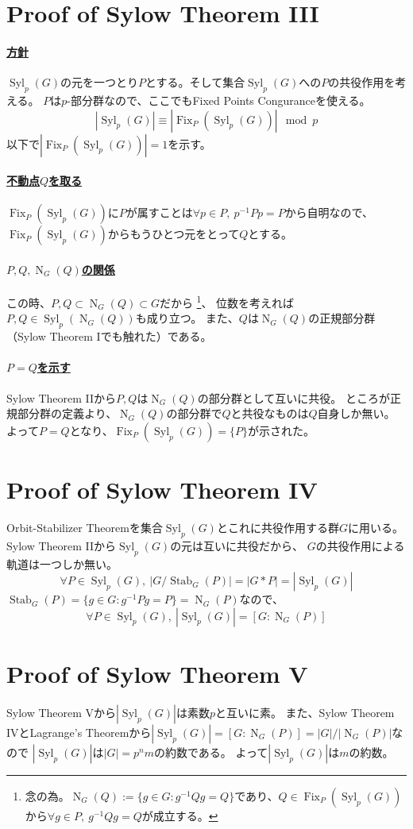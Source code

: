 \documentclass[a4paper]{jarticle}
\newcommand{\Stab}{\operatorname{Stab}}
\newcommand{\Fix}{\operatorname{Fix}}
\newcommand{\Norm}{\operatorname{N}}
\newcommand{\Syl}{\operatorname{Syl}}
\newcommand{\ulpar}[1]{\paragraph{\underline{#1}}}
\begin{document}
    \section{Proof of Sylow Theorem III}
    \ulpar{方針}
    $\Syl_p(G)$の元を一つとり$P$とする。そして集合$\Syl_p(G)$への$P$の共役作用を考える。
    $P$は$p$-部分群なので、ここでもFixed Points Conguranceを使える。
    \[ |\Syl_p(G)| \equiv |\Fix_P(\Syl_p(G))| \mod p\]
    以下で$|\Fix_P(\Syl_p(G))|=1$を示す。

    \ulpar{不動点$Q$を取る}
    $\Fix_P(\Syl_p(G))$に$P$が属すことは$\forall p \in P,~ p^{-1}Pp=P$から自明なので、
    $\Fix_P(\Syl_p(G))$からもうひとつ元をとって$Q$とする。

    \ulpar{$P, Q, \Norm_G(Q)$の関係}
    この時、$P,Q \subset \Norm_G(Q) \subset G$だから
    \footnote{念の為。$\Norm_G(Q):=\{ g \in G : g^{-1}Qg=Q \}$であり、$Q \in \Fix_P(\Syl_p(G))$から$\forall g \in P,~ g^{-1}Qg=Q$が成立する。}、
    位数を考えれば$P,Q \in \Syl_p(\Norm_G(Q))$も成り立つ。
    また、$Q$は$\Norm_G(Q)$の正規部分群（Sylow Theorem Iでも触れた）である。

    \ulpar{$P=Q$を示す}
    Sylow Theorem IIから$P,Q$は$\Norm_G(Q)$の部分群として互いに共役。
    ところが正規部分群の定義より、$\Norm_G(Q)$の部分群で$Q$と共役なものは$Q$自身しか無い。
    よって$P=Q$となり、$\Fix_P(\Syl_p(G))=\{ P \}$が示された。
    

    \section{Proof of Sylow Theorem IV}
    Orbit-Stabilizer Theoremを集合$\Syl_p(G)$とこれに共役作用する群$G$に用いる。
    Sylow Theorem IIから$\Syl_p(G)$の元は互いに共役だから、
    $G$の共役作用による軌道は一つしか無い。
    \[ \forall P \in \Syl_p(G),~ |G/\Stab_G(P)|=|G \ast P|=|\Syl_p(G)|\]
    $\Stab_G(P)=\{ g \in G : g^{-1}Pg=P \}=\Norm_G(P)$なので、
    \[ \forall P \in \Syl_p(G),~ |\Syl_p(G)|=[G:\Norm_G(P)] \]
    

    \section{Proof of Sylow Theorem V}
    Sylow Theorem Vから$|\Syl_p(G)|$は素数$p$と互いに素。
    また、Sylow Theorem IVとLagrange's Theoremから$|\Syl_p(G)|=[G:\Norm_G(P)]=|G|/|\Norm_G(P)|$なので
    $|\Syl_p(G)|$は$|G|=p^n m$の約数である。
    よって$|\Syl_p(G)|$は$m$の約数。
    
\end{document}
